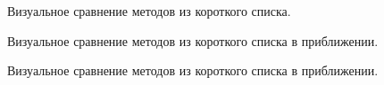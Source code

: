 \documentclass[a4paper,hidelinks,12pt]{article}
\begin{document}
\newpage

\begin{figure}[H]
  \centering
  \caption{Визуальное сравнение методов из короткого списка.}
  \label{fig:my_label}
\end{figure}

\begin{figure}[H]
  \centering
  \caption{Визуальное сравнение методов из короткого списка в приближении.}
  \label{fig:my_label}
\end{figure}

\newpage

\begin{figure}[H]
  \centering
  \caption{Визуальное сравнение методов из короткого списка в приближении.}
  \label{fig:my_label}
\end{figure}
\end{document}
